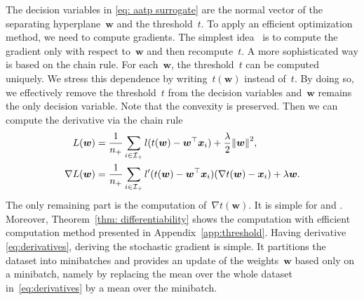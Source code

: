 The decision variables in \eqref{eq: aatp surrogate} are the normal vector of the separating hyperplane~$\bm{w}$ and the threshold~$t$. To apply an efficient optimization method, we need to compute gradients. The simplest idea~\cite{grill2016learning} is to compute the gradient only with respect to~$\bm{w}$ and then recompute~$t$. A more sophisticated way is based on the chain rule. For each~$\bm{w}$, the threshold~$t$ can be computed uniquely. We stress this dependence by writing~$t(\bm{w})$ instead of~$t$. By doing so, we effectively remove the threshold~$t$ from the decision variables and~$\bm{w}$ remains the only decision variable. Note that the convexity is preserved. Then we can compute the derivative via the chain rule
\begin{equation}\label{eq:derivatives}
  \begin{aligned}
  L(\bm{w})
    & = \frac{1}{\npos} \sum_{i \in \Ipos} l(t(\bm{w}) - \bm{w}^{\top} \bm{x}_i) + \frac{\lambda}{2}\norm{\bm{w}}^2, \\
  \nabla L(\bm{w})
    & = \frac{1}{\npos} \sum_{i \in \Ipos} l'(t(\bm{w}) - \bm{w}^{\top} \bm{x}_i)(\nabla t(\bm{w}) - \bm{x}_i) + \lambda \bm{w}.
  \end{aligned}
\end{equation}
The only remaining part is the computation of~$\nabla t(\bm{w})$. It is simple for \Grill and \TopMeanK. Moreover, Theorem~\ref{thm: differentiability} shows the computation \PatMat with efficient computation method presented in Appendix~\ref{app:threshold}. Having derivative \eqref{eq:derivatives}, deriving the stochastic gradient is simple. It partitions the dataset into minibatches and provides an update of the weights~$\bm{w}$ based only on a minibatch, namely by replacing the mean over the whole dataset in~\eqref{eq:derivatives} by a mean over the minibatch.

